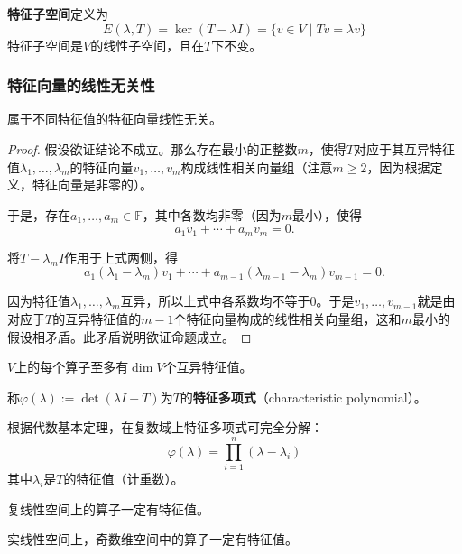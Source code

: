 \begin{definition}[特征子空间]
\textbf{特征子空间}定义为
\[
E(\lambda, T) = \ker(T - \lambda I) = \{v \in V \mid Tv = \lambda v\}
\]
特征子空间是$V$的线性子空间，且在$T$下不变。
\end{definition}

\subsubsection{特征向量的线性无关性}

\begin{theorem}
属于不同特征值的特征向量线性无关。
\end{theorem}

\begin{proof}
假设欲证结论不成立。那么存在最小的正整数$m$，使得$T$对应于其互异特征值$\lambda_1, \ldots, \lambda_m$的特征向量$v_1, \ldots, v_m$构成线性相关向量组（注意$m \geq 2$，因为根据定义，特征向量是非零的）。

于是，存在$a_1, \ldots, a_m \in \mathbb{F}$，其中各数均非零（因为$m$最小），使得
\[
a_1 v_1 + \cdots + a_m v_m = 0.
\]

将$T - \lambda_m I$作用于上式两侧，得
\[
a_1(\lambda_1 - \lambda_m)v_1 + \cdots + a_{m-1}(\lambda_{m-1} - \lambda_m)v_{m-1} = 0.
\]

因为特征值$\lambda_1, \ldots, \lambda_m$互异，所以上式中各系数均不等于$0$。于是$v_1, \ldots, v_{m-1}$就是由对应于$T$的互异特征值的$m-1$个特征向量构成的线性相关向量组，这和$m$最小的假设相矛盾。此矛盾说明欲证命题成立。
\end{proof}

\begin{corollary}
$V$上的每个算子至多有$\dim V$个互异特征值。
\end{corollary}

\begin{definition}[特征多项式]
称$\varphi(\lambda) := \det(\lambda I - T)$为$T$的\textbf{特征多项式}（characteristic polynomial）。
\end{definition}

根据代数基本定理，在复数域上特征多项式可完全分解：
\[
\varphi(\lambda) = \prod_{i=1}^{n}(\lambda - \lambda_i)
\]
其中$\lambda_i$是$T$的特征值（计重数）。

\begin{theorem}
复线性空间上的算子一定有特征值。

实线性空间上，奇数维空间中的算子一定有特征值。
\end{theorem}

